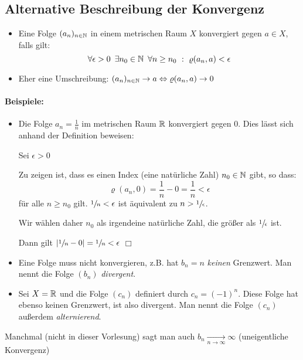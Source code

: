 \subsection{Alternative Beschreibung der Konvergenz}
\begin{itemize}
	\item Eine Folge $(a_n)_{n\in\mathbb{N}}$ in einem metrischen Raum $X$ konvergiert gegen $a\in X$, falls gilt:
	\begin{equation*}
		\forall\epsilon>0\enspace \exists n_0\in\N\enspace \forall n\geq n_0 \ :\ \varrho(a_n,a)<\epsilon
	\end{equation*}
	\item Eher eine Umschreibung: $(a_n)_{n\in\mathbb{N}} \rightarrow a \Leftrightarrow \varrho(a_n,a)\rightarrow 0$
\end{itemize}

\paragraph{Beispiele:}
\begin{itemize}
	\item Die Folge $a_n=\frac 1 n$ im metrischen Raum $\mathbb{R}$ konvergiert gegen $0$. Dies lässt sich anhand der Definition beweisen:

	Sei $\epsilon>0$

	Zu zeigen ist, dass es einen Index (eine natürliche Zahl) $n_0\in\mathbb{N}$ gibt, so dass:
	\begin{equation*}
		\varrho(a_n,0)=\frac 1 n - 0=\frac 1 n <\epsilon
	\end{equation*}
	für alle $n\geq n_0$ gilt. $\sfrac 1 n<\epsilon$ ist äquivalent zu $n>\sfrac 1 \epsilon$.

	Wir wählen daher $n_0$ als irgendeine natürliche Zahl, die größer als $\sfrac 1 \epsilon$ ist.

	Dann gilt $|\sfrac 1 n-0|=\sfrac 1 n<\epsilon$ \hfill $\Box$

	\item Eine Folge muss nicht konvergieren, z.B. hat $b_n=n$ \emph{keinen} Grenzwert. Man nennt die Folge $(b_n)$ \emph{divergent}.

	\item Sei $X=\mathbb{R}$ und die Folge $(c_n)$ definiert durch $c_n=(-1)^n$. Diese Folge hat ebenso keinen Grenzwert, ist also divergent. Man nennt die Folge $(c_n)$ außerdem \emph{alternierend}.
\end{itemize}


Manchmal (nicht in dieser Vorlesung) sagt man auch $b_n\underset{n\rightarrow \infty}{\longrightarrow}\infty$ (uneigentliche Konvergenz)

